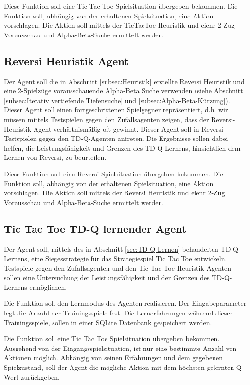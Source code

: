 Diese Funktion soll eine Tic Tac Toe Spielsituation übergeben bekommen. Die Funktion soll, abhängig von der erhaltenen Spielsituation, eine Aktion vorschlagen. Die Aktion soll mittels der TicTacToe-Heuristik und eienr 2-Zug Vorausschau und Alpha-Beta-Suche ermittelt werden.

\subsection{Reversi Heuristik Agent}
Der Agent soll die in Abschnitt \ref{subsec:Heuristik} erstellte Reversi Heuristik und eine 2-Spielzüge vorausschauende Alpha-Beta Suche verwenden (siehe Abschnitt \ref{subsec:Iterativ vertiefende Tiefensuche} und \ref{subsec:Alpha-Beta-Kürzung}). Dieser Agent soll einen fortgeschrittenen Spielgegner repräsentiert, d.h. wir müssen mittels Testspielen gegen den Zufallsagenten zeigen, dass der Reversi-Heuristik Agent verhältnismäßig oft gewinnt. Dieser Agent soll in Reversi Testspielen gegen den TD-Q-Agenten antreten. Die Ergebnisse sollen dabei helfen, die Leistungsfähigkeit und Grenzen des TD-Q-Lernens, hinsichtlich dem Lernen von Reversi, zu beurteilen.

Diese Funktion soll eine Reversi Spielsituation übergeben bekommen. Die Funktion soll, abhängig von der erhaltenen Spielsituation, eine Aktion vorschlagen. Die Aktion soll mittels der Reversi Heuristik und eienr 2-Zug Vorausschau und Alpha-Beta-Suche ermittelt werden.

\subsection{Tic Tac Toe TD-Q lernender Agent}
Der Agent soll, mittels des in Abschnitt \ref{sec:TD-Q-Lernen} behandelten TD-Q-Lernens, eine Siegesstrategie für das Strategiespiel Tic Tac Toe entwickeln. Testspiele gegen den Zufallsagenten und den Tic Tac Toe Heuristik Agenten, sollen eine Untersuchung der Leistungsfähigkeit und der Grenzen des TD-Q-Lernens ermöglichen.

Die Funktion soll den Lernmodus des Agenten realisieren. Der Eingabeparameter legt die Anzahl der Trainingsspiele fest. Die Lernerfahrungen während dieser Trainingsspiele, sollen in einer SQLite Datenbank gespeichert werden.

Die Funktion soll eine Tic Tac Toe Spielsituation übergeben bekommen. Ausgehend von der Eingangsspielsituation, ist nur eine bestimmte Anzahl von Aktionen möglich. Abhängig von seinen Erfahrungen und dem gegebenen Spielzustand, soll der Agent die mögliche Aktion mit dem höchsten gelernten Q-Wert zurückgeben.

